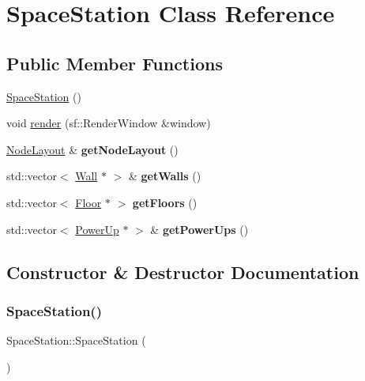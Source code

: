 \hypertarget{class_space_station}{}\section{Space\+Station Class Reference}
\label{class_space_station}
\subsection*{Public Member Functions}
\begin{DoxyCompactItemize}
\item 
\mbox{\hyperlink{class_space_station_ab8582f38baf13f990b87cf42d7c2293c}{Space\+Station}} ()
\item 
void \mbox{\hyperlink{class_space_station_a824f72a1cc84e640f8db8be290227cbe}{render}} (sf\+::\+Render\+Window \&window)
\item 
\mbox{\label{class_space_station_a448dc37ced5e9954461899ddebc8a69e}} 
\mbox{\hyperlink{class_node_layout}{Node\+Layout}} \& {\bfseries get\+Node\+Layout} ()
\item 
\mbox{\label{class_space_station_a3d7dd73588dac0f1c9ae662526c7e29f}} 
std\+::vector$<$ \mbox{\hyperlink{class_wall}{Wall}} $\ast$ $>$ \& {\bfseries get\+Walls} ()
\item 
\mbox{\label{class_space_station_a8a15fe86e9b1639d320951e5914e8120}} 
std\+::vector$<$ \mbox{\hyperlink{class_floor}{Floor}} $\ast$ $>$ {\bfseries get\+Floors} ()
\item 
\mbox{\label{class_space_station_a32f408563c74832a7e5b86f2f2edd0d4}} 
std\+::vector$<$ \mbox{\hyperlink{class_power_up}{Power\+Up}} $\ast$ $>$ \& {\bfseries get\+Power\+Ups} ()
\end{DoxyCompactItemize}


\subsection{Constructor \& Destructor Documentation}
\mbox{\label{class_space_station_ab8582f38baf13f990b87cf42d7c2293c}} 
\subsubsection{\texorpdfstring{Space\+Station()}{SpaceStation()}}
{\footnotesize\ttfamily Space\+Station\+::\+Space\+Station (\begin{DoxyParamCaption}{ }\end{DoxyParamCaption})}

